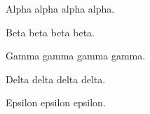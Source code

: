 \documentclass[11pt]{article}
\begin{document}
Alpha alpha alpha alpha.

Beta beta beta beta.

Gamma gamma gamma gamma.

Delta delta delta delta.

Epsilon epsilon epsilon.
\end{document}
